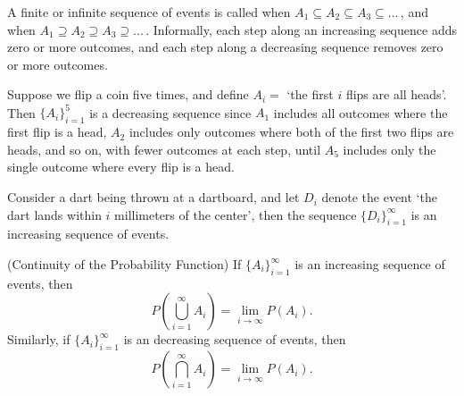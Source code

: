 A finite or infinite sequence of events is called   when $A_1 \subseteq A_2 \subseteq A_3 \subseteq ...$\,, and   when $A_1 \supseteq A_2 \supseteq A_3 \supseteq ...$\,. Informally, each step along an increasing sequence adds zero or more outcomes, and each step along a decreasing sequence removes zero or more outcomes.
\begin{examp} Suppose we flip a coin five times, and define $A_i =$ `the first $i$ flips are all heads'. Then $\{A_i\}_{i=1}^{5}$ is a decreasing sequence since $A_1$ includes all outcomes where the first flip is a head, $A_2$ includes only outcomes where both of the first two flips are heads, and so on, with fewer outcomes at each step, until $A_5$ includes only the single outcome where every flip is a head.
\end{examp}
\begin{examp} Consider a dart being thrown at a dartboard, and let $D_i$ denote the event `the dart lands within $i$ millimeters of the center', then the sequence $\{D_i\}_{i=1}^{\infty}$ is an increasing sequence of events.
\end{examp}
\begin{thm}\label{continuity}
(Continuity of the Probability Function) If $\{A_i\}_{i=1}^{\infty}$ is an increasing sequence of events, then 
$$P(\bigcup_{i=1}^{\infty}A_i) = \lim_{i \to \infty} P(A_i).$$
Similarly, if $\{A_i\}_{i=1}^{\infty}$ is an decreasing sequence of events, then 
$$P(\bigcap_{i=1}^{\infty}A_i) = \lim_{i \to \infty} P(A_i).$$
\end{thm}
